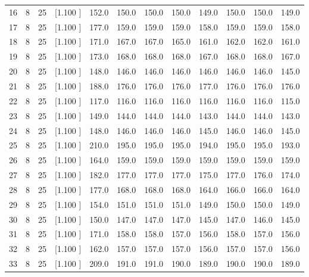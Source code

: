 \documentclass[12pt,a4paper]{article}
\begin{document}
\begin{center}
{\begin{tabular}{r r r r r r r r r r r r}
  16&  8& 25&[1.100     ]&   152.0&   150.0&   150.0&   150.0&   149.0&   150.0&   150.0&   149.0\\[-0.02in]
  17&  8& 25&[1.100     ]&   177.0&   159.0&   159.0&   159.0&   158.0&   159.0&   159.0&   158.0\\[-0.02in]
  18&  8& 25&[1.100     ]&   171.0&   167.0&   167.0&   165.0&   161.0&   162.0&   162.0&   161.0\\[-0.02in]
  19&  8& 25&[1.100     ]&   173.0&   168.0&   168.0&   168.0&   167.0&   168.0&   168.0&   167.0\\[-0.02in]
  20&  8& 25&[1.100     ]&   148.0&   146.0&   146.0&   146.0&   146.0&   146.0&   146.0&   145.0\\[-0.02in]
  21&  8& 25&[1.100     ]&   188.0&   176.0&   176.0&   176.0&   177.0&   176.0&   176.0&   176.0\\[-0.02in]
  22&  8& 25&[1.100     ]&   117.0&   116.0&   116.0&   116.0&   116.0&   116.0&   116.0&   115.0\\[-0.02in]
  23&  8& 25&[1.100     ]&   149.0&   144.0&   144.0&   144.0&   143.0&   144.0&   144.0&   143.0\\[-0.02in]
  24&  8& 25&[1.100     ]&   148.0&   146.0&   146.0&   146.0&   145.0&   146.0&   146.0&   145.0\\[-0.02in]
  25&  8& 25&[1.100     ]&   210.0&   195.0&   195.0&   195.0&   194.0&   195.0&   195.0&   193.0\\[-0.02in]
  26&  8& 25&[1.100     ]&   164.0&   159.0&   159.0&   159.0&   159.0&   159.0&   159.0&   159.0\\[-0.02in]
  27&  8& 25&[1.100     ]&   182.0&   177.0&   177.0&   177.0&   175.0&   177.0&   176.0&   174.0\\[-0.02in]
  28&  8& 25&[1.100     ]&   177.0&   168.0&   168.0&   168.0&   164.0&   166.0&   166.0&   164.0\\[-0.02in]
  29&  8& 25&[1.100     ]&   154.0&   151.0&   151.0&   151.0&   149.0&   150.0&   150.0&   149.0\\[-0.02in]
  30&  8& 25&[1.100     ]&   150.0&   147.0&   147.0&   147.0&   145.0&   147.0&   146.0&   145.0\\[-0.02in]
  31&  8& 25&[1.100     ]&   171.0&   158.0&   158.0&   157.0&   156.0&   158.0&   157.0&   156.0\\[-0.02in]
  32&  8& 25&[1.100     ]&   162.0&   157.0&   157.0&   157.0&   156.0&   157.0&   157.0&   156.0\\[-0.02in]
  33&  8& 25&[1.100     ]&   209.0&   191.0&   191.0&   190.0&   189.0&   190.0&   190.0&   189.0\\[-0.02in]

\end{tabular}}
\end{center}
\end{document}
